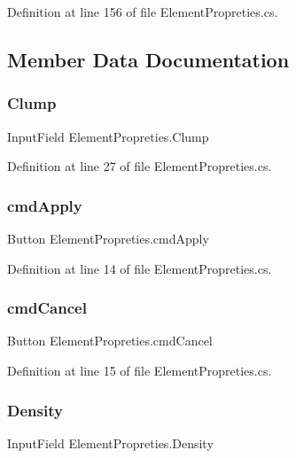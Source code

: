 Definition at line 156 of file Element\+Propreties.\+cs.



\subsection{Member Data Documentation}
\mbox{\label{class_element_propreties_ac76032f9343c404c8561f4101b69d955}} 
\subsubsection{Clump}
{\footnotesize\ttfamily Input\+Field Element\+Propreties.\+Clump}



Definition at line 27 of file Element\+Propreties.\+cs.

\mbox{\label{class_element_propreties_aad892f29c6f5e87c742b2ea326c18862}} 
\subsubsection{cmd\+Apply}
{\footnotesize\ttfamily Button Element\+Propreties.\+cmd\+Apply}



Definition at line 14 of file Element\+Propreties.\+cs.

\mbox{\label{class_element_propreties_ab5080cd75d65a4dac24758040aeaac2d}} 
\subsubsection{cmd\+Cancel}
{\footnotesize\ttfamily Button Element\+Propreties.\+cmd\+Cancel}



Definition at line 15 of file Element\+Propreties.\+cs.

\mbox{\label{class_element_propreties_aa6654cb7bafe8c89df8e775c9ddd80a9}} 
\subsubsection{Density}
{\footnotesize\ttfamily Input\+Field Element\+Propreties.\+Density}



